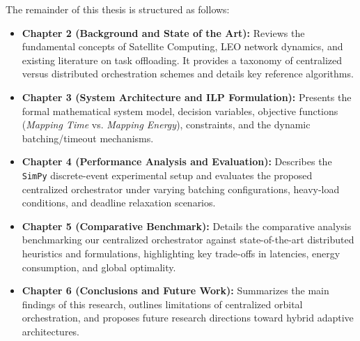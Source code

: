 The remainder of this thesis is structured as follows:

\begin{itemize}
    \item \textbf{Chapter 2 (Background and State of the Art):} Reviews the fundamental concepts of Satellite Computing, LEO network dynamics, and existing literature on task offloading. It provides a taxonomy of centralized versus distributed orchestration schemes and details key reference algorithms.
    \item \textbf{Chapter 3 (System Architecture and ILP Formulation):} Presents the formal mathematical system model, decision variables, objective functions (\textit{Mapping Time} vs. \textit{Mapping Energy}), constraints, and the dynamic batching/timeout mechanisms.
    \item \textbf{Chapter 4 (Performance Analysis and Evaluation):} Describes the \texttt{SimPy} discrete-event experimental setup and evaluates the proposed centralized orchestrator under varying batching configurations, heavy-load conditions, and deadline relaxation scenarios.
    \item \textbf{Chapter 5 (Comparative Benchmark):} Details the comparative analysis benchmarking our centralized orchestrator against state-of-the-art distributed heuristics and formulations, highlighting key trade-offs in latencies, energy consumption, and global optimality.
    \item \textbf{Chapter 6 (Conclusions and Future Work):} Summarizes the main findings of this research, outlines limitations of centralized orbital orchestration, and proposes future research directions toward hybrid adaptive architectures.
\end{itemize}